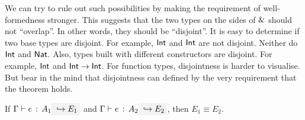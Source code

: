We can try to rule out such possibilities by making the requirement of
well-formedness stronger. This suggests that the two types on the sides of
$\&$ should not ``overlap''. In other words, they should be ``disjoint''. It
is easy to determine if two base types are disjoint. For example, $\textsf{Int}$
and $\textsf{Int}$ are not disjoint. Neither do $\textsf{Int}$ and $\textsf{Nat}$.
Also, types built with different constructors are disjoint. For example,
$\textsf{Int}$ and $\textsf{Int} \to \textsf{Int}$. For function types, disjointness
is harder to visualise. But bear in the mind that disjointness can defined by
the very requirement that the theorem holds.

\begin{theorem} \label{unique-elaboration}
  If $\hastype \Gamma e {A_1} \yields {E_1}$ and $\hastype \Gamma e {A_2}
  \yields {E_2}$, then $E_1 \equiv E_2$.
\end{theorem}
